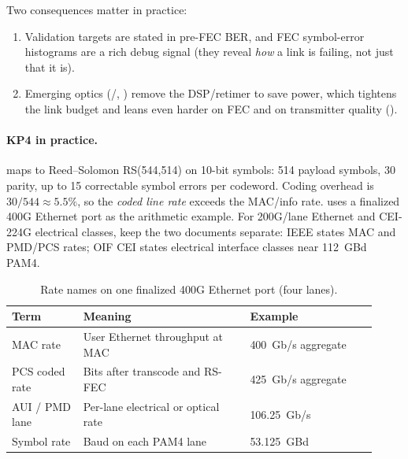 Two consequences matter in practice:

\begin{enumerate}
\item Validation targets are stated in pre-FEC BER, and FEC symbol-error
      histograms are a rich debug signal (they reveal \emph{how} a link is
      failing, not just that it is).
\item Emerging  optics (/, ) remove
      the DSP/retimer to save power, which tightens the link budget and leans
      even harder on FEC and on transmitter quality ().
\end{enumerate}

\paragraph{KP4 in practice.}

 maps to Reed--Solomon RS(544,514) on 10-bit symbols: 514 payload symbols,
30 parity, up to 15 correctable symbol errors per codeword. Coding overhead is
$30/544\approx5.5\%$, so the \emph{coded line rate} exceeds the MAC/info rate.
 uses a finalized 400G Ethernet port as the arithmetic
example. For 200G/lane Ethernet and CEI-224G electrical classes, keep the two
documents separate: IEEE states MAC and PMD/PCS rates; OIF CEI states electrical
interface classes near 112~GBd PAM4.

\begin{table}[ht]
\centering
\caption{Rate names on one finalized 400G Ethernet port (four lanes).
\label{tab:rate-stack}}
\renewcommand{\arraystretch}{1.25}%
\begin{tabular}{@{}p{0.18\linewidth}p{0.42\linewidth}p{0.32\linewidth}@{}}
\toprule
Term & Meaning & Example \\
\midrule
MAC rate & User Ethernet throughput at MAC & 400~Gb/s aggregate \\
\addlinespace[1.5em]
PCS coded rate & Bits after transcode and RS-FEC & 425~Gb/s aggregate \\
\addlinespace[1.5em]
AUI / PMD lane & Per-lane electrical or optical rate & 106.25~Gb/s \\
\addlinespace[1.5em]
Symbol rate & Baud on each PAM4 lane & 53.125~GBd \\
\bottomrule
\end{tabular}
\end{table}

